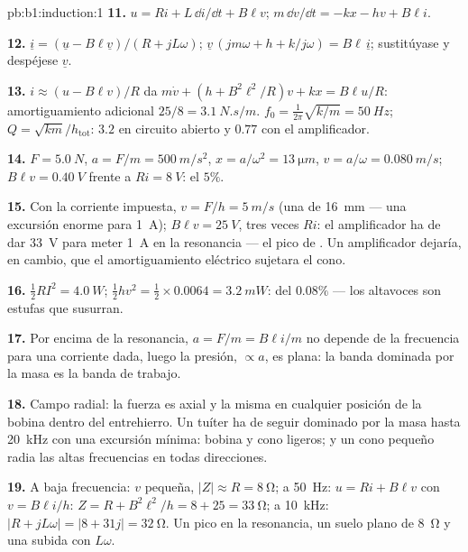 \begin{solution}{pb:b1:induction:1}
\textbf{11.} $u = Ri + L\,\dd i/\dd t + B\ell v$; $m\,\dd v/\dd t = -kx - hv + B\ell i$.

\textbf{12.} $\underline i = (\underline u - B\ell\underline v)/(R + jL\omega)$; $\underline v\,(jm\omega + h +
k/j\omega) = B\ell\,\underline i$; sustitúyase y despéjese $\underline v$.

\textbf{13.} $i \approx (u - B\ell v)/R$ da $m\dot v + (h + B^2\ell^2/R)v + kx =
B\ell u/R$: amortiguamiento adicional $25/8 = \qty{3.1}{N.s/m}$. $f_0 = \tfrac1{2\pi}\sqrt{k/m} =
\qty{50}{Hz}$; $Q = \sqrt{km}/h_{\text{tot}}$: $3.2$ en circuito abierto y $0.77$ con el
amplificador.

\textbf{14.} $F = \qty{5.0}{N}$, $a = F/m = \qty{500}{m/s^2}$, $x = a/\omega^2 =
\qty{13}{\micro m}$, $v = a/\omega = \qty{0.080}{m/s}$; $B\ell v = \qty{0.40}{V}$ frente a
$Ri = \qty{8}{V}$: el $5\%$.

\textbf{15.} Con la corriente impuesta, $v = F/h = \qty{5}{m/s}$ (una
 de \qty{16}{mm} --- una excursión enorme para \qty{1}{A}); $B\ell v =
\qty{25}{V}$, tres veces $Ri$: el amplificador ha de dar \qty{33}{V} para meter
\qty{1}{A} en la resonancia --- el pico de . Un amplificador
 dejaría, en cambio, que el amortiguamiento eléctrico sujetara el cono.

\textbf{16.} $\tfrac12RI^2 = \qty{4.0}{W}$; $\tfrac12hv^2 = \tfrac12 \times 0.0064 =
\qty{3.2}{mW}$:  del $0.08\%$ --- los altavoces son estufas que
susurran.

\textbf{17.} Por encima de la resonancia, $a = F/m = B\ell i/m$ no depende
de la frecuencia para una corriente dada, luego la presión, $\propto a$, es plana:
la banda dominada por la masa es la banda de trabajo.

\textbf{18.} Campo radial: la fuerza es axial y la misma en cualquier
posición de la bobina dentro del entrehierro. Un tuíter ha de seguir
dominado por la masa hasta \qty{20}{kHz} con una excursión mínima: bobina
y cono ligeros; y un cono pequeño radia las altas frecuencias en todas direcciones.

\textbf{19.} A baja frecuencia: $v$ pequeña, $|Z| \approx R = \qty{8}{\ohm}$; a
\qty{50}{Hz}: $u = Ri + B\ell v$ con $v = B\ell i/h$: $Z = R + B^2\ell^2/h = 8 + 25 =
\qty{33}{\ohm}$; a \qty{10}{kHz}: $|R + jL\omega| = |8 + 31j| = \qty{32}{\ohm}$. Un
pico en la resonancia, un suelo plano de \qty{8}{\ohm} y una subida con $L\omega$.


\end{solution}
